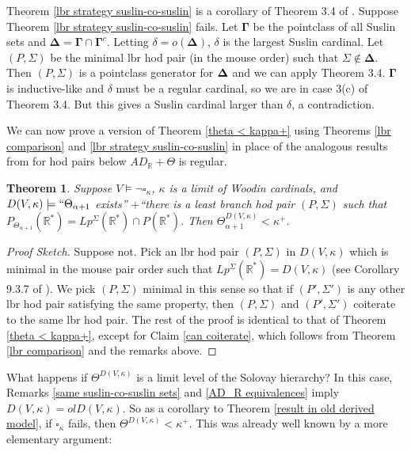 \documentclass[12pt]{article}
\newtheorem{theorem}{Theorem}[section]
\newcommand\R{\mathbb{R}}
\begin{document}
Theorem \ref{lbr strategy suslin-co-suslin} is a corollary of Theorem 3.4 of \cite{mouse_pairs_suslin}. Suppose Theorem \ref{lbr strategy suslin-co-suslin} fails. Let $\mathbf{\Gamma}$ be the pointclass of all Suslin sets and $\mathbf{\Delta} = \mathbf{\Gamma} \cap \mathbf{\Gamma}^c$. Letting $\delta = o(\mathbf{\Delta})$, $\delta$ is the largest Suslin cardinal. Let $(P,\Sigma)$ be the minimal lbr hod pair (in the mouse order) such that $\Sigma\notin \mathbf{\Delta}$. Then $(P,\Sigma)$ is a pointclass generator for $\bf{\Delta}$ and we can apply Theorem 3.4. $\mathbf{\Gamma}$ is inductive-like and $\delta$ must be a regular cardinal, so we are in case 3(c) of Theorem 3.4. But this gives a Suslin cardinal larger than $\delta$, a contradiction.

We can now prove a version of Theorem \ref{theta < kappa+} using Theorems \ref{lbr comparison} and \ref{lbr strategy suslin-co-suslin} in place of the analogous results from \cite{hm&msc} for hod pairs below $AD_\R + \Theta$ is regular.

\begin{theorem}
\label{lbr thm}
    Suppose $V\models \neg\square_\kappa$, $\kappa$ is a limit of Woodin cardinals, and $D(V,\kappa)\models ``\Theta_{\alpha+1}$ exists'' $ + $``there is a least branch hod pair $(P,\Sigma)$ such that $P_{\Theta_{\alpha+1}}(\R^*) = Lp^{\Sigma}(\R^*) \cap P(\R^*)$. Then $\Theta^{D(V,\kappa)}_{\alpha+1} < \kappa^+$.
\end{theorem}
\begin{proof}[Proof Sketch]
    Suppose not. Pick an lbr hod pair $(P,\Sigma)$ in $D(V,\kappa)$ which is minimal in the mouse pair order such that $Lp^\Sigma(\R^*) = D(V,\kappa)$ (see Corollary 9.3.7 of \cite{lbrbook}). We pick $(P,\Sigma)$ minimal in this sense so that if $(P',\Sigma')$ is any other lbr hod pair satisfying the same property, then $(P,\Sigma)$ and $(P',\Sigma')$ coiterate to the same lbr hod pair. The rest of the proof is identical to that of Theorem \ref{theta < kappa+}, except for Claim \ref{can coiterate}, which follows from Theorem \ref{lbr comparison} and the remarks above.
\end{proof}

What happens if $\Theta^{D(V,\kappa)}$ is a limit level of the Solovay hierarchy? In this case, Remarks \ref{same suslin-co-suslin sets} and \ref{AD_R equivalences} imply $D(V,\kappa) = olD(V,\kappa)$. So as a corollary to Theorem \ref{result in old derived model}, if $\square_\kappa$ fails, then $\Theta^{D(V,\kappa)} < \kappa^+$. This was already well known by a more elementary argument:
\end{document}
